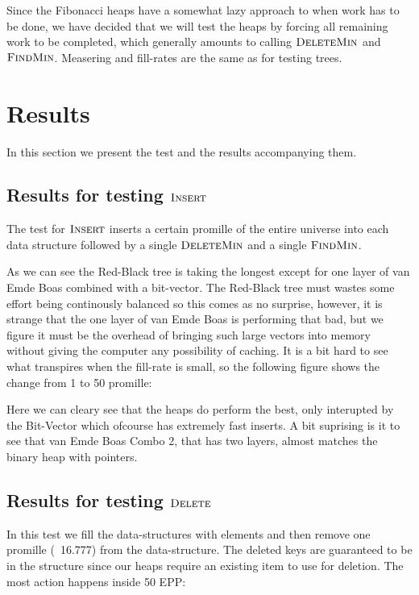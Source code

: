 \documentclass[oneside,11pt,openright]{report}
\newcommand{\FindMin}{\textsc{FindMin}}
\newcommand{\Insert}{\textsc{Insert}}
\newcommand{\DeleteMin}{\textsc{DeleteMin}}
\newcommand{\Delete}{\textsc{Delete}}
\begin{document}
Since the Fibonacci heaps have a somewhat lazy approach to when work has to be done, we have decided that we will test the heaps by forcing all remaining work to be completed, which generally amounts to calling $\DeleteMin$ and $\FindMin$. Measering and fill-rates are the same as for testing trees.

\section{Results}

In this section we present the test and the results accompanying them.

\subsection{Results for testing $\Insert$}

 The test for $\Insert$ inserts a certain promille of the entire universe into each data structure followed by a single $\DeleteMin$ and a single $\FindMin$.



As we can see the Red-Black tree is taking the longest except for one layer of van Emde Boas combined with a bit-vector. The Red-Black tree must wastes some effort being continously balanced so this comes as no surprise, however, it is strange that the one layer of van Emde Boas is performing that bad, but we figure it must be the overhead of bringing such large vectors into memory without giving the computer any possibility of caching. It is a bit hard to see what transpires when the fill-rate is small, so the following figure shows the change from 1 to 50 promille:



Here we can cleary see that the heaps do perform the best, only interupted by the Bit-Vector which ofcourse has extremely fast inserts. A bit suprising is it to see that van Emde Boas Combo 2, that has two layers, almost matches the binary heap with pointers.

\subsection{Results for testing $\Delete$}

In this test we fill the data-structures with elements and then remove one promille (~16.777) from the data-structure. The deleted keys are guaranteed to be in the structure since our heaps require an existing item to use for deletion. The most action happens inside 50 EPP:
\end{document}
